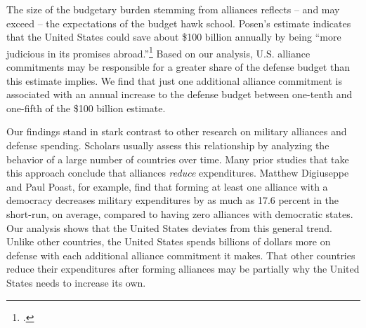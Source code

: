 The size of the budgetary burden stemming from alliances reflects -- and may exceed -- the expectations of the budget hawk school. Posen's estimate indicates that the United States could save about \$100 billion annually by being ``more judicious in its promises abroad.''\footcite{posenTNI16} Based on our analysis, U.S. alliance commitments may be responsible for a greater share of the defense budget than this estimate implies. We find that just one additional alliance commitment is associated with an annual increase to the defense budget between one-tenth and one-fifth of the \$100 billion estimate.




Our findings stand in stark contrast to other research on military alliances and defense spending. Scholars usually assess this relationship by analyzing the behavior of a large number of countries over time. Many prior studies that take this approach conclude that alliances \textit{reduce} expenditures.\autocite[For a study that reaches a different conclusion, see][]{MorganPalmer2003} Matthew Digiuseppe and Paul Poast, for example, find that forming at least one alliance with a democracy decreases military expenditures by as much as 17.6 percent in the short-run, on average, compared to having zero alliances with democratic states.\autocite{DigiuseppePoast2016} Our analysis shows that the United States deviates from this general trend. Unlike other countries, the United States spends billions of dollars more on defense with each additional alliance commitment it makes. That other countries reduce their expenditures after forming alliances may be partially why the United States needs to increase its own. 

